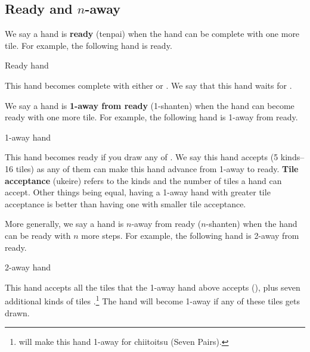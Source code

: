 \subsection{Ready and $n$-away}
	 
We say a hand is {\bf ready} ({\jap tenpai}) when the hand can be complete with one more tile. For example, the following hand is ready. 
\bigskip
\begin{itembox}[r]{Ready hand}
\bp
{}\zhong\zhong\zhong
\ep
\end{itembox}
This hand becomes complete with either {\LARGE{}} or {\LARGE{}}. We say that this hand waits for {\LARGE{} }.

\bigskip

We say a hand is {\bf 1-away from ready} (1-{\jap shanten}) when the hand can become ready with one more tile. For example, the following hand is 1-away from ready. 
\bigskip
\begin{itembox}[r]{1-away hand}
\bp
{}\zhong\zhong\zhong
\ep
\end{itembox}
This hand becomes ready if you draw any of {\LARGE{}}. We say this hand accepts {\LARGE{}} (5 kinds--16 tiles) as any of them can make this hand advance from 1-away to ready. {\bf Tile acceptance} ({\jap ukeire}) refers to the kinds and the number of tiles a hand can accept. Other things being equal, having a 1-away hand with greater tile acceptance is better than having one with smaller tile acceptance. 

\bigskip
More generally, we say a hand is $n$-away from ready ($n$-{\jap shanten}) when the hand can be ready with $n$ more steps. For example, the following hand is 2-away from ready. 
\bigskip
\begin{itembox}[r]{2-away hand}
\bp
{}\zhong\zhong\zhong
\ep
\end{itembox} \vspace{5pt}
\noindent
This hand accepts all the tiles that the 1-away hand above accepts ({\LARGE{}}), plus seven additional kinds of tiles {\LARGE{}}.\footnote{ will make this hand 1-away for {\jap chiitoitsu} (Seven Pairs).} 
The hand will become 1-away if any of these tiles gets drawn. 

